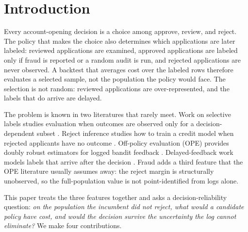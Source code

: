 \documentclass[conference]{IEEEtran}
\begin{document}
\section{Introduction}

Every account-opening decision is a choice among approve, review, and reject. The policy that makes the choice also determines which applications are later labeled: reviewed applications are examined, approved applications are labeled only if fraud is reported or a random audit is run, and rejected applications are never observed. A backtest that averages cost over the labeled rows therefore evaluates a selected sample, not the population the policy would face. The selection is not random: reviewed applications are over-represented, and the labels that do arrive are delayed.

The problem is known in two literatures that rarely meet. Work on selective labels studies evaluation when outcomes are observed only for a decision-dependent subset \cite{lakkaraju2017selective,kleinberg2018human}. Reject inference studies how to train a credit model when rejected applicants have no outcome \cite{boyes1989econometric,crook2004reject,ehrhardt2021reject,kozodoi2025fighting,scarone2026illusion}. Off-policy evaluation (OPE) provides doubly robust estimators for logged bandit feedback \cite{dudik2011dr,dudik2014dr,swaminathan2015self,chernozhukov2018dml}. Delayed-feedback work models labels that arrive after the decision \cite{chapelle2014delayed,dalpozzolo2015delayed}. Fraud adds a third feature that the OPE literature usually assumes away: the reject margin is structurally unobserved, so the full-population value is not point-identified from logs alone.

This paper treats the three features together and asks a decision-reliability question: \emph{on the population the incumbent did not reject, what would a candidate policy have cost, and would the decision survive the uncertainty the log cannot eliminate?} We make four contributions.
\end{document}
